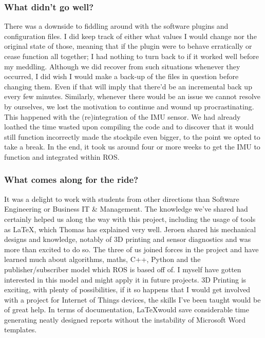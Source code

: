\subsubsection{What didn't go well?}
There was a downside to fiddling around with the software plugins and configuration files.
I did keep track of either what values I would change nor the original state of those, meaning that if the plugin were to behave erratically or cease function all together; I had nothing to turn back to if it worked well before my meddling. 
Although we did recover from such situations whenever they occurred, I did wish I would make a back-up of the files in question before changing them.
Even if that will imply that there'd be an incremental back up every few minutes.
Similarly, whenever there would be an issue we cannot resolve by ourselves, we lost the motivation to continue and wound up procrastinating. 
This happened with the (re)integration of the IMU sensor. 
We had already loathed the time wasted upon compiling the code and to discover that it would still function incorrectly made the stockpile even bigger, to the point we opted to take a break.
In the end, it took us around four or more weeks to get the IMU to function and integrated within ROS.

\subsubsection{What comes along for the ride?}
It was a delight to work with students from other directions than Software Engineering or Business IT \& Management. 
The knowledge we've shared had certainly helped us along the way with this project, including the usage of tools as \LaTeX, which Thomas has explained very well. Jeroen shared his mechanical designs and knowledge, notably of 3D printing and sensor diagnostics and was more than excited to do so.
The three of us joined forces in the project and have learned much about algorithms, maths, C++, Python and the publisher/subscriber model which ROS is based off of.
I myself have gotten interested in this model and might apply it in future projects.
3D Printing is exciting, with plenty of possibilities, if it so happens that I would get involved with a project for Internet of Things devices, the skills I've been taught would be of great help.
In terms of documentation, \LaTeX would save considerable time generating neatly designed reports without the instability of Microsoft Word templates.


\newpage

